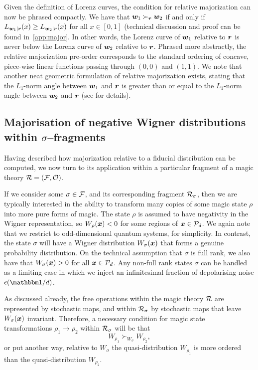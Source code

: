 \documentclass[pra,
aps,
twocolumn,
superscriptaddress,
groupedaddress,
nofootinbib,
reprint
]{revtex4-1}
\begin{document}
Given the definition of Lorenz curves, the condition for relative majorization can now be phrased compactly. We have that $\boldsymbol{w}_1 \succ_{\boldsymbol{r}} \boldsymbol{w}_2$ if and only if $L_{\boldsymbol{w}_1 | \boldsymbol{r}} (x) \ge L_{\boldsymbol{w}_2 | \boldsymbol{r}}(x)$ for all $x \in [0,1]$ (technical discussion and proof can be found in~\cref{app:major}. In other words, the Lorenz curve of $\boldsymbol{w}_1$ relative to $\boldsymbol{r}$ is never below the Lorenz curve of $\boldsymbol{w}_2$ relative to $\boldsymbol{r}$. Phrased more abstractly, the relative majorization pre-order corresponds to the standard ordering of concave, piece-wise linear functions passing through $(0,0)$ and $(1,1)$. We note that another neat geometric formulation of relative majorization exists, stating that the $L_1$-norm angle between $\boldsymbol{w}_1$ and $\boldsymbol{r}$ is greater than or equal to the $L_1$-norm angle between $\boldsymbol{w}_2$ and $\boldsymbol{r}$ (see \ddd{[CITE]} for details).

\subsection{Majorisation of negative Wigner distributions within $\sigma$--fragments}\label{sec:major_frag}

Having described how majorization relative to a fiducial distribution can be computed, we now turn to its application within a particular fragment of a magic theory $\mathcal{R}= (\mathcal{F}, \mathcal{O})$.

If we consider some $\sigma \in \mathcal{F}$, and its corresponding fragment $\mathcal{R}_\sigma$, then we are typically interested in the ability to transform many copies of some magic state $\rho$ into more pure forms of magic. The state $\rho$ is assumed to have negativity in the Wigner representation, so $W_\rho(\boldsymbol{x}) < 0$ for some regions of $\boldsymbol{x} \in {\mathcal P}_d$. We again note that we restrict to odd-dimensional quantum systems, for simplicity. In contrast, the state $\sigma$ will have a Wigner distribution $W_\sigma(\boldsymbol{x})$ that forms a genuine probability distribution. On the technical assumption that $\sigma$ is full rank, we also have that $W_\sigma(\boldsymbol{x}) > 0$ for all $\boldsymbol{x} \in {\mathcal P}_d$. Any non-full rank states $\sigma$ can be handled as a limiting case in which we inject an infinitesimal fraction of depolarising noise $\epsilon (\id/d)$.

As discussed already, the free operations within the magic theory $\mathcal{R}$ are represented by stochastic maps, and within $\mathcal{R}_\sigma$ by stochastic maps that leave $W_\sigma(\boldsymbol{x})$ invariant. Therefore, a necessary condition for magic state transformations $\rho_1 \rightarrow \rho_2$ within $\mathcal{R}_\sigma$ will be that 
\begin{equation}
W_{\rho_1} \succ_{W_{\sigma}} W_{\rho_2},
\end{equation}
or put another way, relative to $W_\sigma$ the quasi-distribution $W_{\rho_1}$ is more ordered than the quasi-distribution $W_{\rho_2}$. 
\end{document}
